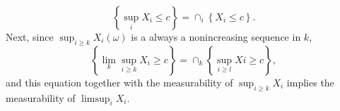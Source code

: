 \documentclass[a4paper, 12pt]{exam}
\begin{document}
\begin{questions}
\begin{solution}
\begin{itemize}
		\begin{equation*}
		\left\{\sup_i X_i \le c\right\} = \cap_i\left\{X_i \le c\right\}.
		\end{equation*}
		Next, since $\sup_{i\ge k} X_i(\omega)$ is a always a nonincreasing sequence in $k$,
		\begin{equation*}
	    \left\{\lim_{k}\sup_{i\ge k}X_i \ge c\right\} = \cap_k\left\{\sup_{i\ge l}Xi \ge c\right\},
		\end{equation*}
		and this equation together with the measurability of $\sup_{i \ge k} X_i$ implies the measurability of $\limsup_{i}X_i$.
	\end{itemize}
\end{solution}
\end{questions}  
\end{document}
